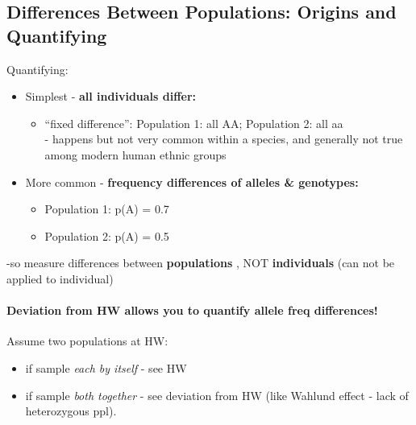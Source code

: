 \documentclass{scrartcl}
\begin{document}
\subsection{Differences Between Populations: Origins and Quantifying}
\label{sec:06-4}
Quantifying:
\begin{itemize}
\item Simplest - {\bf all individuals differ: }
  \begin{itemize}
  \item ``fixed difference'': Population 1: all AA; Population 2: all aa\\
    - happens but not very common within a species, and generally not true among modern human ethnic groups
  \end{itemize}
\item More common - {\bf frequency differences of alleles \& genotypes: }
  \begin{itemize}
  \item Population 1: p(A) = 0.7
  \item Population 2: p(A) = 0.5
  \end{itemize}
\end{itemize}
-so measure differences between {\bf populations }, NOT {\bf individuals } (can not be applied to individual)

\paragraph{Deviation from HW allows you to quantify allele freq differences!}

Assume two populations at HW:
\begin{itemize}
\item if sample {\em each by itself} - see HW
\item if sample {\em both together} - see deviation from HW (like Wahlund effect - lack of heterozygous ppl).
\end{itemize}
\end{document}
